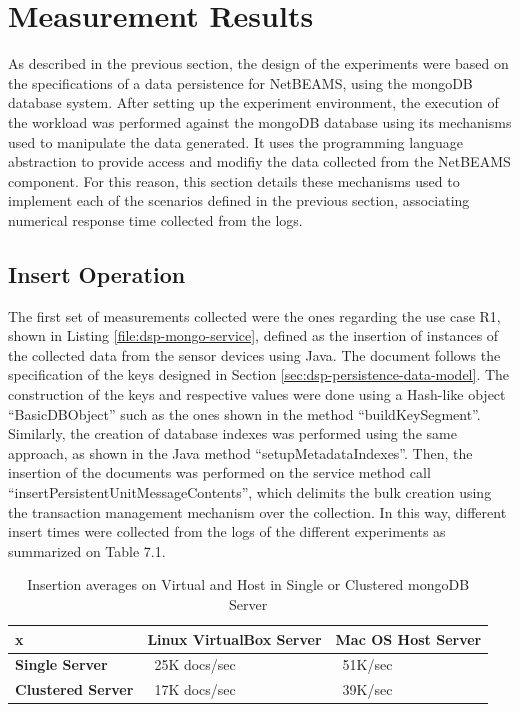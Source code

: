 \section{Measurement Results}
\label{sec:exp-measurements}

As described in the previous section, the design of the experiments were based
on the specifications of a data persistence for NetBEAMS, using the mongoDB
database system. After setting up the experiment environment, the execution of
the workload was performed against the mongoDB database using its mechanisms
used to manipulate the data generated. It uses the programming language
abstraction to provide access and modifiy the data collected from the NetBEAMS
component. For this reason, this section details these mechanisms used to
implement each of the scenarios defined in the previous section, associating
numerical response time collected from the logs.

\subsection{Insert Operation}

The first set of measurements collected were the ones regarding the use case
R1, shown in Listing \ref{file:dsp-mongo-service}, defined as the insertion of
instances of the collected data from the sensor devices using Java. The
document follows the specification of the keys designed in Section
\ref{sec:dsp-persistence-data-model}. The construction of the keys
and respective values were done using a Hash-like object ``BasicDBObject''
such as the ones shown in the method ``buildKeySegment''. Similarly, the
creation of database indexes was performed using the same approach, as shown in
the Java method ``setupMetadataIndexes''. Then, the insertion of the
documents was performed on the service method call
``insertPersistentUnitMessageContents'', which delimits the bulk creation using
the transaction management mechanism over the collection. In this way,
different insert times were collected from the logs of the different
experiments as summarized on Table 7.1.

\begin{table}[!h]
    \begin{center}
        \begin{tabular}{|p{100pt}|p{100pt}|p{100pt}|}\hline
           x & \textbf{Linux VirtualBox Server} & \textbf{Mac OS Host Server}\\\hline 
           \textbf{Single Server} & ~25K docs/sec & ~51K/sec \\\hline
           \textbf{Clustered Server} & ~17K docs/sec & ~39K/sec \\\hline
        \end{tabular}
        \caption{Insertion averages on Virtual and Host in Single or Clustered
        mongoDB Server}
    \end{center}
    \label{tab:experiment-insert-avarage}
\end{table}

